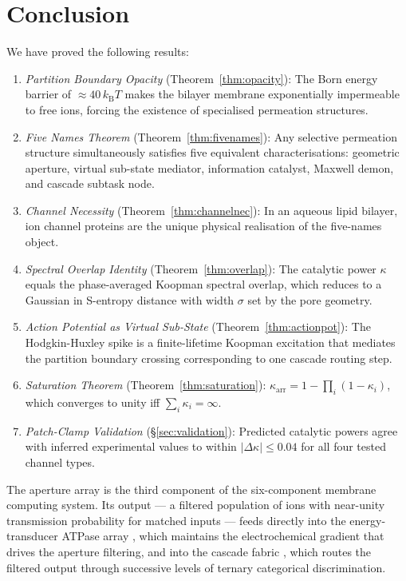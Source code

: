 \documentclass[11pt,twocolumn,a4paper]{article}
\theoremstyle{definition}
\theoremstyle{remark}
\newcommand{\kB}{k_{\mathrm{B}}}
\newcommand{\kap}{\kappa}
\begin{document}
\section{Conclusion}
\label{sec:conclusion}

We have proved the following results:

\begin{enumerate}[nosep]
\item \textit{Partition Boundary Opacity} (Theorem~\ref{thm:opacity}):
  The Born energy barrier of $\approx 40\,\kB T$ makes the bilayer
  membrane exponentially impermeable to free ions, forcing the existence
  of specialised permeation structures.
\item \textit{Five Names Theorem} (Theorem~\ref{thm:fivenames}):
  Any selective permeation structure simultaneously satisfies five
  equivalent characterisations: geometric aperture, virtual sub-state
  mediator, information catalyst, Maxwell demon, and cascade subtask node.
\item \textit{Channel Necessity} (Theorem~\ref{thm:channelnec}):
  In an aqueous lipid bilayer, ion channel proteins are the unique
  physical realisation of the five-names object.
\item \textit{Spectral Overlap Identity} (Theorem~\ref{thm:overlap}):
  The catalytic power $\kap$ equals the phase-averaged Koopman spectral
  overlap, which reduces to a Gaussian in S-entropy distance with
  width $\sigma$ set by the pore geometry.
\item \textit{Action Potential as Virtual Sub-State}
  (Theorem~\ref{thm:actionpot}): The Hodgkin-Huxley spike is a finite-lifetime
  Koopman excitation that mediates the partition boundary crossing corresponding
  to one cascade routing step.
\item \textit{Saturation Theorem} (Theorem~\ref{thm:saturation}):
  $\kap_{\mathrm{arr}} = 1 - \prod_i(1-\kap_i)$, which converges to unity
  iff $\sum_i \kap_i = \infty$.
\item \textit{Patch-Clamp Validation} (\S\ref{sec:validation}):
  Predicted catalytic powers agree with inferred experimental values to
  within $|\Delta\kap| \leq 0.04$ for all four tested channel types.
\end{enumerate}

The aperture array is the third component of the six-component membrane
computing system. Its output --- a filtered population of ions with near-unity
transmission probability for matched inputs --- feeds directly into the
energy-transducer ATPase array \citep{companion4}, which maintains the
electrochemical gradient that drives the aperture filtering, and into
the cascade fabric \citep{companion5}, which routes the filtered output
through successive levels of ternary categorical discrimination.



\end{document}

